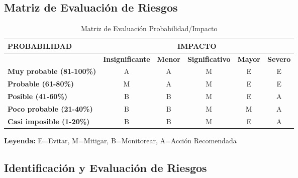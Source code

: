 \subsection{Matriz de Evaluación de Riesgos}

\begin{table}[H]
\centering
\small
\renewcommand{\arraystretch}{1.2}
\begin{tabular}{|l|c|c|c|c|c|}
\hline
\textbf{PROBABILIDAD} & \multicolumn{5}{c|}{\textbf{IMPACTO}} \\
\hline
& \textbf{Insignificante} & \textbf{Menor} & \textbf{Significativo} & \textbf{Mayor} & \textbf{Severo} \\
\hline
\textbf{Muy probable (81-100\%)} & A & A & M & E & E \\
\hline
\textbf{Probable (61-80\%)} & M & A & M & E & E \\
\hline
\textbf{Posible (41-60\%)} & B & B & M & E & A \\
\hline
\textbf{Poco probable (21-40\%)} & B & B & M & M & A \\
\hline
\textbf{Casi imposible (1-20\%)} & B & B & M & E & A \\
\hline
\end{tabular}
\caption{Matriz de Evaluación Probabilidad/Impacto}
\label{tab:matriz-evaluacion-riesgos}
\end{table}

\textbf{Leyenda:} E=Evitar, M=Mitigar, B=Monitorear, A=Acción Recomendada

\subsection{Identificación y Evaluación de Riesgos}

